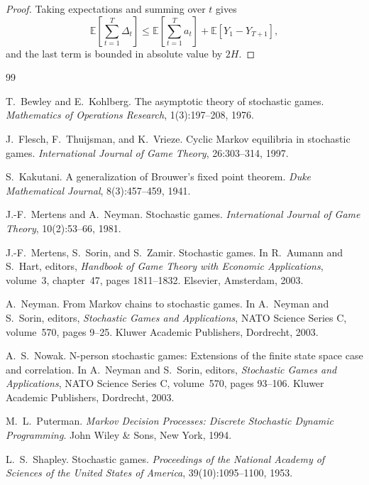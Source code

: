 \documentclass[12pt]{article}
\theoremstyle{definition}
\newcommand{\E}{\mathbb{E}}
\newcommand{\1}{\mathbf{1}}
\begin{document}
\begin{proof}
Taking expectations and summing over $t$ gives
\[
\E\left[\sum_{t=1}^T \Delta_t\right]
\le
\E\left[\sum_{t=1}^T a_t\right]
+
\E[Y_1-Y_{T+1}],
\]
and the last term is bounded in absolute value by $2H$.
\end{proof}

\begin{thebibliography}{99}


T.~Bewley and E.~Kohlberg.
\newblock The asymptotic theory of stochastic games.
\newblock \emph{Mathematics of Operations Research}, 1(3):197--208, 1976.

J.~Flesch, F.~Thuijsman, and K.~Vrieze.
\newblock Cyclic {M}arkov equilibria in stochastic games.
\newblock \emph{International Journal of Game Theory}, 26:303--314, 1997.

S.~Kakutani.
\newblock A generalization of {B}rouwer's fixed point theorem.
\newblock \emph{Duke Mathematical Journal}, 8(3):457--459, 1941.

J.-F.~Mertens and A.~Neyman.
\newblock Stochastic games.
\newblock \emph{International Journal of Game Theory}, 10(2):53--66, 1981.

J.-F.~Mertens, S.~Sorin, and S.~Zamir.
\newblock Stochastic games.
\newblock In R.~Aumann and S.~Hart, editors, \emph{Handbook of Game Theory with
Economic Applications}, volume~3, chapter~47, pages 1811--1832. Elsevier,
Amsterdam, 2003.

A.~Neyman.
\newblock From {M}arkov chains to stochastic games.
\newblock In A.~Neyman and S.~Sorin, editors, \emph{Stochastic Games and
Applications}, NATO Science Series C, volume~570, pages 9--25. Kluwer Academic
Publishers, Dordrecht, 2003.

A.~S.~Nowak.
\newblock N-person stochastic games: Extensions of the finite state space case and
correlation.
\newblock In A.~Neyman and S.~Sorin, editors, \emph{Stochastic Games and
Applications}, NATO Science Series C, volume~570, pages 93--106. Kluwer Academic
Publishers, Dordrecht, 2003.

M.~L.~Puterman.
\newblock \emph{Markov Decision Processes: Discrete Stochastic Dynamic
Programming}.
\newblock John Wiley \& Sons, New York, 1994.

L.~S.~Shapley.
\newblock Stochastic games.
\newblock \emph{Proceedings of the National Academy of Sciences of the United
States of America}, 39(10):1095--1100, 1953.


\end{thebibliography}
\end{document}
